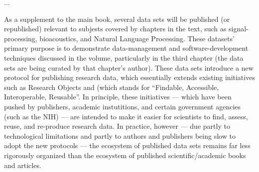 \documentclass[10pt,letterpaper]{article}
\newcommand{\sectsp}{\vspace{12pt}}
\newcommand{\FAIR}{\resizebox{!}{8pt}{\AcronymText{FAIR}}}
\newcommand{\textscc}[1]{{\color{orr!35!black}{{%
						\fontfamily{Cabin-TLF}\fontseries{b}\selectfont{\textsc{\scriptsize{#1}}}}}}}
\newcommand{\AcronymText}[1]{{\textscc{#1}}}
\newcommand{\p}[1]{

\vspace{.85em}#1}
\newcommand{\q}[1]{{\fontfamily{qcr}\selectfont ``}#1{\fontfamily{qcr}\selectfont ''}}
\newcommand{\llMOSAIC}{\mbox{{\LARGE MOSAIC}}}
\newcommand{\llWC}{\mbox{{\LARGE WhiteCharmDB}}}
\newcommand{\lun}[1]{\raisebox{-4pt}{\fontfamily{qcr}\selectfont{%
\LARGE{\textbf{\textcolor{tcolor}{#1}}}}}\vspace{-2pt}}
\begin{document}
	
{\linespread{1.1}\selectfont

\vspace*{-7em}

\begin{center}


\vspace{1em}


\begin{tcolorbox}
[
arc=2pt,outer arc=0pt,
enhanced jigsaw,
width=.984\textwidth,
colback=ctmpppp!30,
colframe=logoRed!30!darkRed,
drop shadow=logoPurple!50!darkRed,
]
\begin{minipage}{\textwidth}	
\begin{center}		
{\setlength{\fboxsep}{19pt}
	}
\end{center}
\end{minipage}
\end{tcolorbox}
\end{center}

\vspace{-1.5em}

...
\p{As a supplement to the main book, 
several data sets will be published (or 
republished) relevant to subjests covered by 
chapters in the text, such as signal-processing, 
bioacoustics, and Natural Language Processing.  
These datasets' primary purpose is to demonstrate 
data-management and software-development techniques 
discussed in the volume, particularly in the 
third chapter (the data sets are being curated by that 
chapter's author).  These data sets introduce a new 
protocol for publishing research data, which essentially 
extends existing initiatives such as Research Objects 
and \FAIR{} (which stands for \q{Findable, Accessible, 
Interoperable, Reusable}.  In principle, these initiatives 
--- which have been pushed by publishers, academic 
instutitions, and certain government agencies 
(such as the NIH) --- are intended to make 
it easier for scientists to find, assess, 
reuse, and re-produce research data.  
In practice, however --- due partly to  
technological limitations and partly to 
authors and publishers being slow to adopt 
the new protocols --- the ecosystem of 
published data sets remains far less rigorously 
organized than the ecosystem of published 
scientific/academic books and articles.}

}
\end{document}
